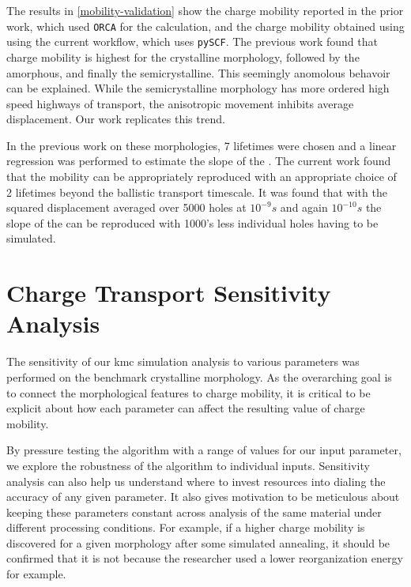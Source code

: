 The results in \ref{mobility-validation} show the charge mobility reported in the prior work, which used \texttt{ORCA} for
the  calculation, and the charge mobility obtained using using the current workflow, which uses \texttt{pySCF}. 
The previous work found that charge mobility is highest for the crystalline morphology, followed by the
amorphous, and finally the semicrystalline. This seemingly anomolous behavoir can be explained. While the
semicrystalline morphology has more ordered high speed highways of transport, the anisotropic movement
inhibits average displacement. Our work replicates this trend.

In the previous work on these  morphologies, 7 lifetimes were chosen and a linear regression was performed
to estimate the slope of the . The current work found that the mobility can be appropriately reproduced
with an appropriate choice of 2 lifetimes beyond the ballistic transport timescale. It was found that with the 
squared displacement averaged over 5000 holes at $10^{-9}s$ and again $10^{-10}s$ the slope of the  can be reproduced with 1000's less individual holes having to be simulated.

\section{Charge Transport Sensitivity Analysis}

\label{sensitivity}

The sensitivity of our \gls{kmc} simulation analysis to various parameters was performed on the benchmark 
crystalline  morphology. As the overarching goal is to
connect the morphological features to charge mobility, it is critical to be
explicit about how each parameter can affect the resulting value of charge
mobility. 

By pressure testing the algorithm with a range of values for our input
parameter, we explore the robustness of the algorithm to individual inputs.
Sensitivity analysis can also help us understand where to
invest resources into dialing
the accuracy of any given parameter. It also gives motivation to be meticulous about keeping these parameters
constant across analysis of the same material under different processing conditions. For example, if a higher
charge mobility is discovered for a given morphology after some simulated annealing,
it should be confirmed that it is not because the researcher used a lower reorganization energy for example. 

